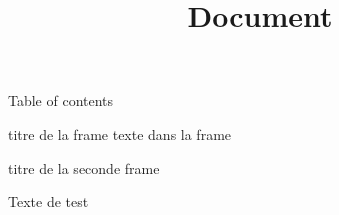 \documentclass{beamer}
\begin{document}
\title{ Document }




\frame{\titlepage}
\begin{frame}{ Table of contents }
    \tableofcontents
\end{frame}\begin{frame}{ titre de la frame }
    texte dans la frame
\end{frame}
\begin{frame}{ titre de la seconde frame }
    
\end{frame}
Texte de test
\end{document}
